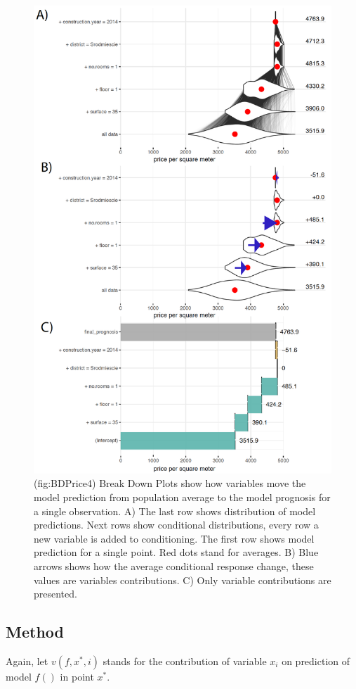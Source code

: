 \documentclass[12pt,]{krantz}
\theoremstyle{definition}
\theoremstyle{definition}
\theoremstyle{definition}
\theoremstyle{remark}
\begin{document}
\begin{figure}

{\centering \includegraphics[width=0.7\linewidth]{figure/bd_price_4} 

}

\caption{(fig:BDPrice4) Break Down Plots show how variables move the model prediction from population average to the model prognosis for a single observation. A) The last row shows distribution of model predictions. Next rows show conditional distributions, every row a new variable is added to conditioning. The first row shows model prediction for a single point. Red dots stand for averages. B) Blue arrows shows how the average conditional response change, these values are variables contributions. C) Only variable contributions are presented. }\label{fig:BDPrice4}
\end{figure}

\hypertarget{method-5}{%
\subsection{Method}\label{method-5}}

Again, let \(v(f, x^*, i)\) stands for the contribution of variable
\(x_i\) on prediction of model \(f()\) in point \(x^*\).
\end{document}
